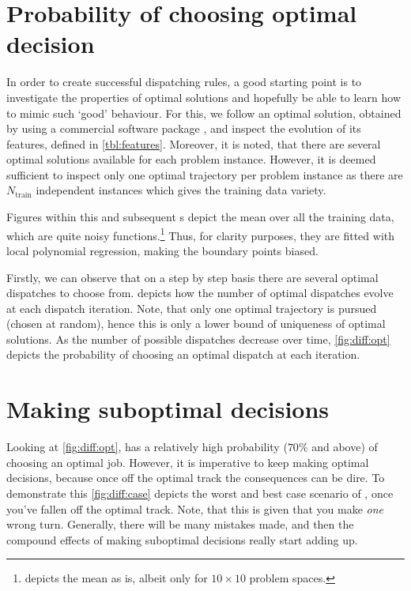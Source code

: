 \section{Probability of choosing optimal decision}\label{sec:diff:opt:rnd}
In order to create successful dispatching rules, a good starting point is to investigate the properties of optimal solutions and hopefully be able to learn how to mimic such `good' behaviour. For this, we follow an optimal solution, obtained by using a commercial software package \cite{gurobi}, and inspect the evolution of its features, defined in \cref{tbl:features}. Moreover, it is noted, that there are several optimal solutions available for each problem instance. However, it is deemed sufficient to inspect only one optimal trajectory per problem instance as there are $N_{\text{train}}$ independent instances which gives the training data variety. 

Figures within this and subsequent s depict the mean over all the training data, which are quite noisy functions.\footnote{\citet{InRu14c} depicts the mean as is, albeit only for $10\times10$ problem spaces.} Thus, for clarity purposes, they are fitted with local polynomial regression, making the boundary points biased. 

Firstly, we can observe that on a step by step basis there are several optimal dispatches to choose from.  depicts how the number of optimal dispatches evolve at each dispatch iteration. Note, that only one optimal trajectory is pursued (chosen at random), hence this is only a lower bound of uniqueness of optimal solutions.
As the number of possible dispatches decrease over time, \cref{fig:diff:opt} depicts the probability of choosing an optimal dispatch at each iteration. 

\section{Making suboptimal decisions}\label{sec:diff:opt:sub}
Looking at \cref{fig:diff:opt},  has a relatively high probability ($70\%$ and above) of choosing an optimal job. However, it is imperative to keep making optimal decisions, because once off the optimal track the consequences can be dire. To demonstrate this \cref{fig:diff:case} depicts the worst and best case scenario of \namerho, once you've fallen off the optimal track. Note, that this is given that you make \emph{one} wrong turn. Generally, there will be many mistakes made, and then the compound effects of making suboptimal decisions really start adding up. 

